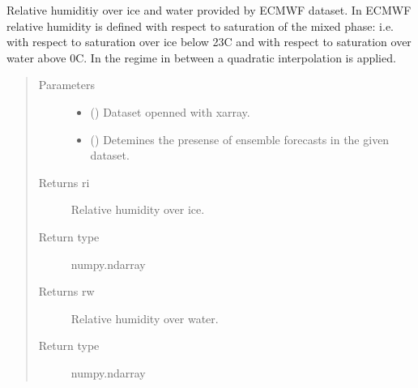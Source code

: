 \documentclass[a4paper,11pt,english]{sphinxmanual}
\begin{document}
\begin{fulllineitems}
\label{\detokenize{modules:envlib.contrail.get_relative_hum}}
Relative humiditiy over ice and water provided by ECMWF dataset. In ECMWF relative humidity is defined with respect 
to saturation of the mixed phase: i.e. with respect to saturation over ice below \sphinxhyphen{}23C and with respect to saturation over water above 0C. 
In the regime in between a quadratic interpolation is applied.
\begin{quote}\begin{description}
\item[{Parameters}] \leavevmode\begin{itemize}
\item {} 
 () \textendash{} Dataset openned with xarray.

\item {} 
 () \textendash{} Detemines the presense of ensemble forecasts in the given dataset.

\end{itemize}

\item[{Returns ri}] \leavevmode
Relative humidity over ice.

\item[{Return type}] \leavevmode
numpy.ndarray

\item[{Returns rw}] \leavevmode
Relative humidity over water.

\item[{Return type}] \leavevmode
numpy.ndarray

\end{description}\end{quote}

\end{fulllineitems}

\end{document}
